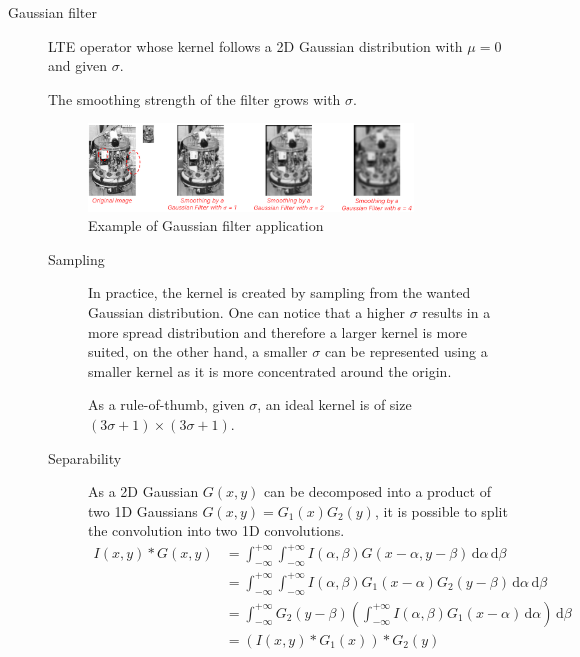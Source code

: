 \begin{description}
    \item[Gaussian filter] 
        LTE operator whose kernel follows a 2D Gaussian distribution with $\mu=0$ and given $\sigma$.

        \begin{remark}
            The smoothing strength of the filter grows with $\sigma$.
        \end{remark}

        \begin{figure}[H]
            \centering
            \includegraphics[width=0.85\textwidth]{./img/_gaussian_filter_example.pdf}
            \caption{Example of Gaussian filter application}
        \end{figure}

        \begin{description}
            \item[Sampling]
                In practice, the kernel is created by sampling from the wanted Gaussian distribution.
                One can notice that a higher $\sigma$ results in a more spread distribution and therefore a larger kernel is more suited,
                on the other hand, a smaller $\sigma$ can be represented using a smaller kernel as it is more concentrated around the origin.

                As a rule-of-thumb, given $\sigma$, an ideal kernel is of size $(3\sigma+1) \times (3\sigma+1)$.

            \item[Separability]
                As a 2D Gaussian $G(x, y)$ can be decomposed into a product of two 1D Gaussians $G(x, y) = G_1(x)G_2(y)$,
                it is possible to split the convolution into two 1D convolutions.
                \[ 
                    \begin{split}
                        I(x, y) * G(x, y) &= \int_{-\infty}^{+\infty}\int_{-\infty}^{+\infty} I(\alpha, \beta) G(x-\alpha, y-\beta) \,\text{d}\alpha\,\text{d}\beta \\
                            &= \int_{-\infty}^{+\infty}\int_{-\infty}^{+\infty} I(\alpha, \beta) G_1(x-\alpha)G_2(y-\beta) \,\text{d}\alpha\,\text{d}\beta \\
                            &= \int_{-\infty}^{+\infty} G_2(y-\beta) \left( \int_{-\infty}^{+\infty} I(\alpha, \beta) G_1(x-\alpha) \,\text{d}\alpha \right) \,\text{d}\beta \\
                            &= (I(x, y) * G_1(x)) * G_2(y)
                    \end{split}
                \]


\end{description}
\end{description}

